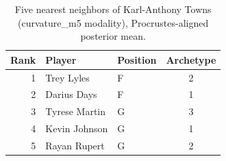\begin{table}[htbp]
  \centering\small
  \begin{tabular}{rllc}
    \toprule
    Rank & Player & Position & Archetype \\
    \midrule
    1 & Trey Lyles & F & 2 \\
    2 & Darius Days & F & 1 \\
    3 & Tyrese Martin & G & 3 \\
    4 & Kevin Johnson & G & 1 \\
    5 & Rayan Rupert & G & 2 \\
    \bottomrule
  \end{tabular}
  \caption{Five nearest neighbors of Karl-Anthony Towns (curvature_m5 modality), Procrustes-aligned posterior mean.}
  \label{tab:Karl_Anthony_Towns_neighbors_curvature_m5}
\end{table}

